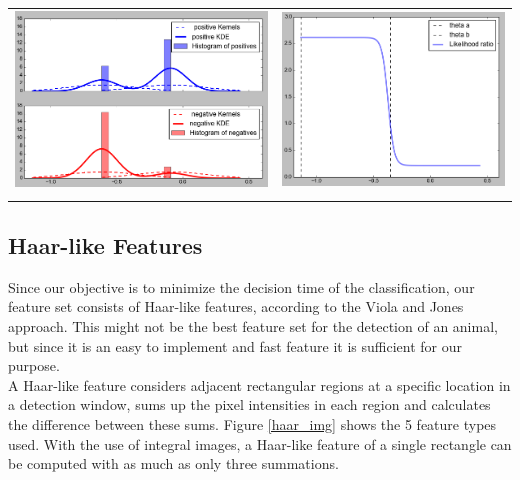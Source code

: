 \documentclass[11pt]{article}
\begin{document}
\begin{tabular}{ll}
\includegraphics[scale=0.270]{res/links.png}
& 
\includegraphics[scale=0.275]{res/rechts.png}
\\
\label{threshold}
\end{tabular}

\subsection{Haar-like Features}
Since our objective is to minimize the decision time of the classification, our feature set consists of Haar-like features, according to the Viola and Jones approach. This might not be the best feature set for the detection of an animal, but since it is an easy to implement and fast feature it is sufficient for our purpose.\\
A Haar-like feature considers adjacent rectangular regions at a specific location in a detection window, sums up the pixel intensities in each region and calculates the difference between these sums. Figure \ref{haar_img} shows the 5 feature types used. With the use of integral images, a Haar-like feature of a single rectangle can be computed with as much as only three summations.\\
\end{document}
